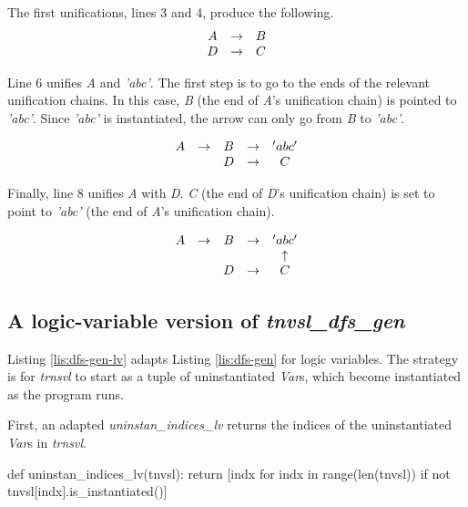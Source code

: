 The first unifications, lines 3 and 4, produce the following. 
\begin{equation}\label{eq:one}
\begin{array}{c c c c c c c c }
A & \to & B \\
D & \to & C 
\end{array}
\end{equation}

Line 6 unifies \textit{A} and \textit{'abc'}. The first step is to go to the ends of the relevant unification chains. In this case, \textit{B} (the end of \textit{A}'s unification chain) is pointed to \textit{'abc'}. Since  \textit{'abc'} is instantiated, the arrow can only go from \textit{B} to \textit{'abc'}. 

\begin{equation}\label{eq:two}
\begin{array}{c c c c c c c c c c c}
A & \to & B            & \to & 'abc'    \\ 
  &     & D            & \to & C        
\end{array}
\end{equation}

Finally, line 8  unifies \textit{A} with \textit{D}. \textit{C} (the end of \textit{D}'s unification chain) is set to point to \textit{'abc'} (the end of \textit{A}'s unification chain). %

\begin{equation}\label{eq:three}
\begin{array}{c c c c c c c c c c c}
A & \to & B            & \to & 'abc'      \\ 
  &     &              &     & \uparrow   \\ 
  &     & D            & \to & C        
\end{array}
\end{equation}

\subsection{A logic-variable version of \textit{tnvsl\_dfs\_gen}}
Listing \ref{lis:dfs-gen-lv} adapts Listing \ref{lis:dfs-gen} for logic variables. The strategy is for \textit{trnsvl} to start as a tuple of uninstantiated \textit{Var}s, which become instantiated as the program runs.

First, an adapted \textit{uninstan\_indices\_lv} returns the indices of the uninstantiated \textit{Var}s in \textit{trnsvl}.
\begin{center}
\begin{minipage}[c]{0.45\textwidth}
\begin{python1}
def uninstan_indices_lv(tnvsl):
  return [indx for indx in range(len(tnvsl)) 
               if not tnvsl[indx].is_instantiated()]
\end{python1}
\end{minipage}
\end{center}

